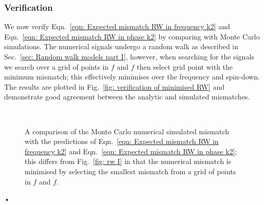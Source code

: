 \subsubsection{Verification}

We now verify Eqn.~\eqref{eqn: Expected mismatch RW in frequency k2} and
Eqn.~\eqref{eqn: Expected mismatch RW in phase k2} by comparing with Monte
Carlo simulations. The numerical signals undergo a random walk as described in
Sec.~\ref{sec: Random walk models part I}, however, when searching for the
signals we search over a grid of points in $f$ and $\dot{f}$ then select grid point
with the minimum mismatch; this effectively minimises over the frequency and
spin-down. The results are plotted in Fig.~\ref{fig: verification of
minimised RW} and demonstrate good agreement between the analytic and simulated
mismatches.

\begin{figure}[ht]
\centering
{}
\\
\caption{A comparison of the Monto Carlo numerical simulated mismatch with the
predictions of Eqn.~\eqref{eqn: Expected mismatch RW in
frequency k2} and Eqn.~\eqref{eqn: Expected mismatch RW in phase k2}; this differs
from Fig.~\ref{fig: rw I} in that the numerical mismatch is minimised by selecting
the smallest mismatch from a grid of points in $f$ and $\dot{f}$.}
\label{fig: verification of minimised RW}
\end{figure}•
\FloatBarrier
